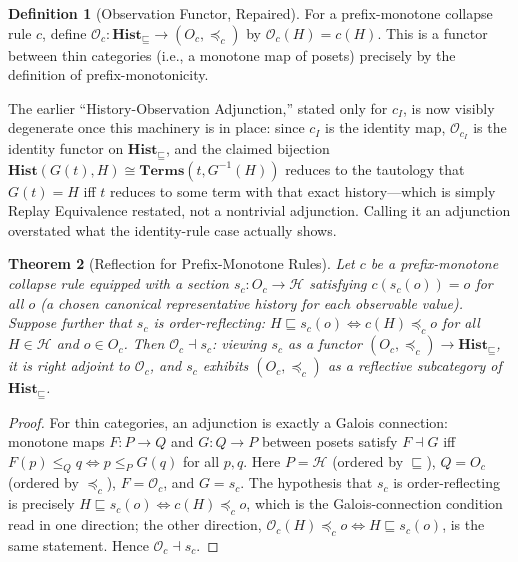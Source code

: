 \documentclass[12pt, a4paper, openany]{book}
\theoremstyle{plain}
\newtheorem{theorem}{Theorem}[chapter]
\theoremstyle{definition}
\newtheorem{definition}[theorem]{Definition}
\theoremstyle{remark}
\newcommand{\Hist}{\mathbf{Hist}}
\newcommand{\calH}{\mathcal{H}}
\begin{document}
\begin{definition}[Observation Functor, Repaired]
For a prefix-monotone collapse rule $c$, define
$\mathcal{O}_c : \Hist_\sqsubseteq \to (O_c, \preceq_c)$ by
$\mathcal{O}_c(H) = c(H)$. This is a functor between thin categories (i.e., a
monotone map of posets) precisely by the definition of prefix-monotonicity.
\end{definition}

The earlier ``History-Observation Adjunction,'' stated only for $c_I$, is now
visibly degenerate once this machinery is in place: since $c_I$ is the identity
map, $\mathcal{O}_{c_I}$ is the identity functor on $\Hist_\sqsubseteq$, and the
claimed bijection $\Hist(G(t), H) \cong \mathbf{Terms}(t, G^{-1}(H))$ reduces to
the tautology that $G(t) = H$ iff $t$ reduces to some term with that exact
history---which is simply Replay Equivalence restated, not a nontrivial
adjunction. Calling it an adjunction overstated what the identity-rule case
actually shows.

\begin{theorem}[Reflection for Prefix-Monotone Rules]
\label{thm:reflection-repaired}
Let $c$ be a prefix-monotone collapse rule equipped with a section
$s_c : O_c \to \calH$ satisfying $c(s_c(o)) = o$ for all $o$ (a chosen canonical
representative history for each observable value). Suppose further that $s_c$
is \emph{order-reflecting}: $H \sqsubseteq s_c(o) \iff c(H) \preceq_c o$ for all
$H \in \calH$ and $o \in O_c$. Then $\mathcal{O}_c \dashv s_c$: viewing $s_c$ as
a functor $(O_c, \preceq_c) \to \Hist_\sqsubseteq$, it is right adjoint to
$\mathcal{O}_c$, and $s_c$ exhibits $(O_c, \preceq_c)$ as a reflective
subcategory of $\Hist_\sqsubseteq$.
\end{theorem}

\begin{proof}
For thin categories, an adjunction is exactly a Galois connection: monotone
maps $F : P \to Q$ and $G : Q \to P$ between posets satisfy $F \dashv G$ iff
$F(p) \leq_Q q \iff p \leq_P G(q)$ for all $p, q$. Here $P = \calH$ (ordered by
$\sqsubseteq$), $Q = O_c$ (ordered by $\preceq_c$), $F = \mathcal{O}_c$, and
$G = s_c$. The hypothesis that $s_c$ is order-reflecting is precisely
$H \sqsubseteq s_c(o) \iff c(H) \preceq_c o$, which is the Galois-connection
condition read in one direction; the other direction,
$\mathcal{O}_c(H) \preceq_c o \iff H \sqsubseteq s_c(o)$, is the same statement.
Hence $\mathcal{O}_c \dashv s_c$.
\end{proof}
\end{document}
